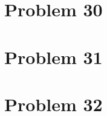 \documentclass[12pt]{article}
\begin{document}
\section{Problem 30}

\section{Problem 31}

\section{Problem 32}
\end{document}
